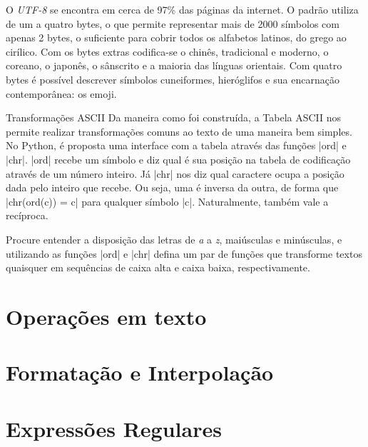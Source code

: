     O \emph{UTF-8} se encontra em cerca de 97\% das páginas da internet\cite{w3techs:2021}. O padrão utiliza de um a quatro bytes, o que permite representar mais de 2000 símbolos com apenas 2 bytes, o suficiente para cobrir todos os alfabetos latinos, do grego ao cirílico. Com os bytes extras codifica-se o chinês, tradicional e moderno, o coreano, o japonês, o sânscrito e a maioria das línguas orientais. Com quatro bytes é possível descrever símbolos cuneiformes, hieróglifos e sua encarnação contemporânea: os emoji.\par

    \begin{problem}{Transformações ASCII}%
    Da maneira como foi construída, a Tabela ASCII nos permite realizar transformações comuns ao texto de uma maneira bem simples. No Python, é proposta uma interface com a tabela através das funções |ord| e |chr|. |ord| recebe um símbolo e diz qual é sua posição na tabela de codificação através de um número inteiro. Já |chr| nos diz qual caractere ocupa a posição dada pelo inteiro que recebe. Ou seja, uma é inversa da outra, de forma que |chr(ord(c)) = c| para qualquer símbolo |c|. Naturalmente, também vale a recíproca.\par

    \proposal Procure entender a disposição das letras de \emph{a} a \emph{z}, maiúsculas e minúsculas, e utilizando as funções |ord| e |chr| defina um par de funções que transforme textos quaisquer em sequências de caixa alta e caixa baixa, respectivamente.
    \end{problem}

    \section*{Operações em texto}

    \section*{Formatação e Interpolação}

    \section*{Expressões Regulares}